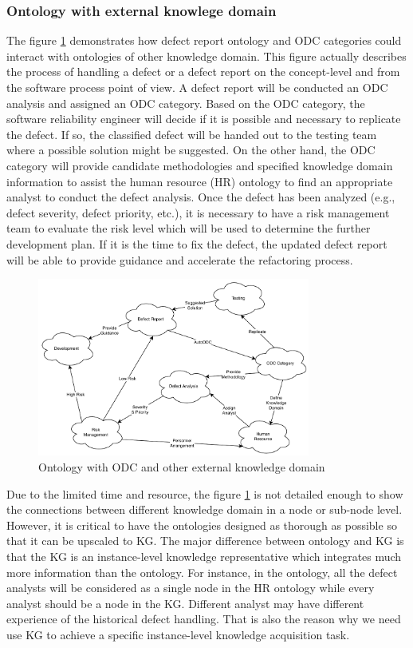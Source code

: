 \documentclass[12pt] {article}
\begin{document}
\subsubsection{Ontology with external knowlege domain}
The figure \ref{fig:external} demonstrates how defect report ontology and ODC categories could interact with ontologies of other knowledge domain.
This figure actually describes the process of handling a defect or a defect report on the concept-level and from the software process point of view.
A defect report will be conducted an ODC analysis and assigned an ODC category.
Based on the ODC category, the software reliability engineer will decide if it is possible and necessary to replicate the defect.
If so, the classified defect will be handed out to the testing team where a possible solution might be suggested.
On the other hand, the ODC category will provide candidate methodologies and specified knowledge domain information to assist the human resource (HR) ontology to find an appropriate analyst to conduct the defect analysis.
Once the defect has been analyzed (e.g., defect severity, defect priority, etc.), it is necessary to have a risk management team to evaluate the risk level which will be used to determine the further development plan.
If it is the time to fix the defect, the updated defect report will be able to provide guidance and accelerate the refactoring process.\par
\begin{figure}[h]
    \centering
    \includegraphics[width=0.8\textwidth]{../figures/OntologyOfExternal.pdf}
    \caption{Ontology with ODC and other external knowledge domain}
    \label{fig:external}
\end{figure}
Due to the limited time and resource, the figure \ref{fig:external} is not detailed enough to show the connections between different knowledge domain in a node or sub-node level.
However, it is critical to have the ontologies designed as thorough as possible so that it can be upscaled to KG.
The major difference between ontology and KG is that the KG is an instance-level knowledge representative which integrates much more information than the ontology.
For instance, in the ontology, all the defect analysts will be considered as a single node in the HR ontology while every analyst should be a node in the KG. 
Different analyst may have different experience of the historical defect handling.
That is also the reason why we need use KG to achieve a specific instance-level knowledge acquisition task.
\end{document}
